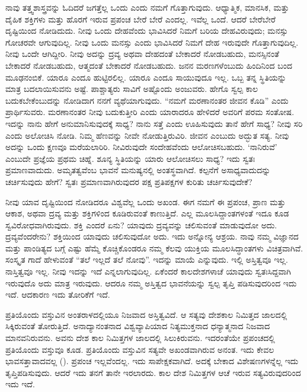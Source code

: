 ನಾವು ತತ್ತ್ವಶಾಸ್ತ್ರವನ್ನು ಓದಿದರೆ ಜಗತ್ತೆಲ್ಲ ಒಂದು ಎಂದು ನಮಗೆ ಗೊತ್ತಾಗುವುದು. ಆಧ್ಯಾತ್ಮಿಕ, ಮಾನಸಿಕ, ಮತ್ತು ದೈಹಿಕ ಶಕ್ತಿಗಳು ಮತ್ತು ಹೊರಗೆ ಇರುವ ಪ್ರಪಂಚ ಬೇರೆ ಬೇರೆ ಎಂದಲ್ಲ. ಇವೆಲ್ಲ ಒಂದೆ. ಆದರೆ ಬೇರೆಬೇರೆ ದೃಷ್ಟಿಯಿಂದ ನೋಡಿದುದು. ನೀವು ಒಂದು ದೇಹವೆಂದು ಭಾವಿಸಿದರೆ ನಿಮಗೆ ಬರಿಯ ದೇಹವಿರುವುದು; ಮನಸ್ಸು ಗೋಚರವೇ ಆಗುವುದಿಲ್ಲ. ನೀವು ಒಂದು ಮನಸ್ಸು ಎಂದು ಭಾವಿಸಿದರೆ ನಿಮಗೆ ದೇಹ ಇರುವುದೇ ಗೊತ್ತಾಗುವುದಿಲ್ಲ. ನೀವು ಒಂದೇ ಆಗಿದ್ದೀರಿ. ನೀವು ಅದನ್ನು ದ್ರವ್ಯ ಅಥವಾ ದೇಹದಂತೆ ಬೇಕಾದರೆ ನೋಡಬಹುದು, ಮನಸ್ಸಿನಂತೆ ಬೇಕಾದರೆ ನೋಡಬಹುದು, ಆತ್ಮದಂತೆ ಬೇಕಾದರೆ ನೋಡಬಹುದು. ಜನನ ಮರಣಗಳೆಂಬುದು ಹಿಂದಿನಿಂದ ಬಂದ ಮೂಢನಂಬಿಕೆ. ಯಾರೂ ಎಂದೂ ಹುಟ್ಟಿರಲಿಲ್ಲ. ಯಾರೂ ಎಂದೂ ಸಾಯುವುದೂ ಇಲ್ಲ. ಒಬ್ಬ ತನ್ನ ಸ್ಥಿತಿಯನ್ನು ಮಾತ್ರ ಬದಲಾಯಿಸುವನು ಅಷ್ಟೆ. ಪಾಶ್ಚಾತ್ಯರು ಸಾವಿಗೆ ಅಷ್ಟೊಂದು ಅಂಜುವರು. ಹೇಗೊ ಸ್ವಲ್ಪ ಕಾಲ ಬದುಕಬೇಕೆಂಬುದನ್ನು ನೋಡಿದಾಗ ನನಗೆ ವ್ಯಥೆಯಾಗುವುದು. “ನಮಗೆ ಮರಣಾನಂತರ ಜೀವನ ಕೊಡಿ'' ಎಂದು ಪ್ರಾರ್ಥಿಸುವರು. ಮರಣಾನಂತರ ನೀವು ಬದುಕುತ್ತೀರಿ ಎಂದು ಯಾರಾದರೂ ಹೇಳಿದರೆ ಅವರಿಗೆ ಪರಮ ಸಂತೋಷ. ಇದನ್ನು ನಾನು ಹೇಗೆ ಅನುಮಾನಿಸುವುದಕ್ಕೆ ಸಾಧ್ಯ? ನಾನು ಸತ್ತೆ ಎಂದು ಊಹಿಸುವುದು ತಾನೆ ಹೇಗೆ ಸಾಧ್ಯ? ನೀವು ಸರಿ ಎಂದು ಅಲೋಚಿಸಿ ನೋಡಿ. ನಿಮ್ಮ ಹೆಣವನ್ನು ನೀವೇ ನೋಡುತ್ತಿರುವಿರಿ. ಜೀವನ ಎಂಬುದು ಅದ್ಭುತ ಸತ್ಯ. ನೀವು ಅದನ್ನು ಒಂದು ಕ್ಷಣವೂ ಮರೆಯಲಾರಿರಿ. ನೀವಿರುವುದೇ ಸಂದೇಹವೆಂದು ಆಲೋಚಿಸಬಹುದು. `ನಾನಿರುವೆ' ಎಂಬುದೇ ಪ್ರಜ್ಞೆಯ ಪ್ರಥಮ ಚಿಹ್ನೆ. ಶೂನ್ಯ ಸ್ಥಿತಿಯನ್ನು ಯಾರು ಆಲೋಚಿಸಲು ಸಾಧ್ಯ? ಇದು ಸ್ವತಃ ಪ್ರಮಾಣವಾದುದು. ಅಮೃತತ್ವವೆಂಬ ಭಾವನೆ ಮನುಷ್ಯನಲ್ಲಿ ಅಂತಸ್ಥವಾಗಿದೆ. ಕಲ್ಪನೆಗೆ ಅಸಾಧ್ಯವಾದುದನ್ನು ಚರ್ಚಿಸುವುದು ಹೇಗೆ? ಸ್ವತಃ ಪ್ರಮಾಣವಾಗಿರುವುದರ ಪಕ್ಷ ಪ್ರತಿಪಕ್ಷಗಳ ಕುರಿತು ಚರ್ಚಿಸುವುದೇಕೆ?

ನೀವು ಯಾವ ದೃಷ್ಟಿಯಿಂದ ನೋಡಿದರೂ ವಿಶ್ವವೆಲ್ಲ ಒಂದು ಅಖಂಡ. ಈಗ ನಮಗೆ ಈ ಪ್ರಪಂಚ, ಪ್ರಾಣ ಮತ್ತು ಆಕಾಶ, ಅಥವಾ ದ್ರವ್ಯ ಮತ್ತು ಶಕ್ತಿಗಳಿಂದ ಕೂಡಿರುವಂತೆ ಕಾಣುತ್ತಿದೆ. ಎಲ್ಲ ಮೂಲಸಿದ್ದಾಂತಗಳಂತೆ ಇದೂ ಕೂಡ ಸ್ವವಿರೋಧವಾಗಿರುವುದು. ಶಕ್ತಿ ಎಂದರೆ ಏನು? ಯಾವುದು ದ್ರವ್ಯವನ್ನು ಚಲಿಸುವಂತೆ ಮಾಡುವುದೋ ಅದು. ದ್ರವ್ಯವೆಂದರೇನು? ಶಕ್ತಿಯಿಂದ ಯಾವುದು ಚಲಿಸುವುದೋ ಅದು. ಇದು ಅನ್ನೋನ್ಯ ಆಶ್ರಯ. ನಾವು ನಮ್ಮ ವಿಜ್ಞಾನದ ಮತ್ತು ಪಾಂಡಿತ್ಯದ ಬಗ್ಗೆ ಎಷ್ಟು ಹೆಮ್ಮೆ ಕೊಚ್ಚಿಕೊಂಡರೂ ನಮ್ಮ ಕೆಲವು ಯುಕ್ತಿಯ ಮೂಲಸಿದ್ಧಾಂತಗಳು ವಿಚಿತ್ರವಾಗಿವೆ. ಸಂಸ್ಕೃತ ಗಾದೆ ಹೇಳುವಂತೆ “ತಲೆ ಇಲ್ಲದೆ ತಲೆ ನೋವು”. ಇದನ್ನು ಮಾಯೆ ಎನ್ನುವುದು. ಇಲ್ಲಿ ಅಸ್ತಿತ್ವವೂ ಇಲ್ಲ. ನಾಸ್ತಿತ್ವವೂ ಇಲ್ಲ. ನೀವು ಇದನ್ನು ಇದೆ ಎನ್ನಲಾಗುವುದಿಲ್ಲ. ಏಕೆಂದರೆ ಕಾಲದೇಶಗಳಾಚೆ ಯಾವುದು ಸ್ವತಃಸಿದ್ದವಾಗಿ ಇರುವುದೊ ಅದು ಮಾತ್ರ ಇರುವುದು. ಆದರೂ ನಮ್ಮ ಅಸ್ತಿತ್ವದ ಭಾವನೆಯನ್ನು ಸ್ವಲ್ಪ ತೃಪ್ತಿ ಪಡಿಸುವುದರಿಂದ ಇದು ಇದೆ. ಆದಕಾರಣ ಇದು ತೋರಿಕೆಗೆ ಇದೆ.

ಪ್ರತಿಯೊಂದು ವಸ್ತುವಿನ ಅಂತರಾಳದಲ್ಲಿಯೂ ನಿಜವಾದ ಅಸ್ತಿತ್ವವಿದೆ. ಆ ಸತ್ಯವು ದೇಶಕಾಲ ನಿಮಿತ್ತದ ಜಾಲದಲ್ಲಿ ಸಿಕ್ಕಿರುವಂತೆ ತೋರುತ್ತಿದೆ. ಅನಾದ್ಯಾನಂತನಾದ ವಿಶ್ವವ್ಯಾಪಿಯಾದ ನಿತ್ಯಮುಕ್ತನಾದ ಧನ್ಯಾತ್ಮನಾದ ನಿಜವಾದ ಮಾನವನಿರುವನು. ಅವನು ದೇಶ ಕಾಲ ನಿಮಿತ್ತಗಳ ಜಾಲದಲ್ಲಿ ಸಿಲುಕಿರುವನು. ಇದರಂತೆಯೇ ಪ್ರಪಂಚದಲ್ಲಿ ಪ್ರತಿಯೊಂದು ವಸ್ತುವೂ ಕೂಡ. ಪ್ರತಿಯೊಂದು ವಸ್ತುವಿನ ಸತ್ಯವೇ ಅಖಂಡವಾಗಿರುವ ಅನಂತ. ಇದು ಕೇವಲ ಭಾವಸತ್ತಾವಾದವಲ್ಲ (). ಪ್ರಪಂಚ ಇಲ್ಲವೆಂದಲ್ಲ. ಇದು ಸಾಪೇಕ್ಷಕವಾಗಿದೆ. ಅದಕ್ಕೆ ಬೇಕಾದ ವಿಶೇಷಣಗಳನ್ನೆಲ್ಲ ಇದು ತೃಪ್ತಿಪಡಿಸುವುದು. ಆದರೆ ಇದು ತನಗೆ ತಾನೇ ಇರಲಾರದು. ಕಾಲ ದೇಶ ನಿಮಿತ್ತಗಳ ಆಚೆ ಇರುವ ಸತ್ಯವಿರುವುದರಿಂದ ಇದು ಇದೆ.

